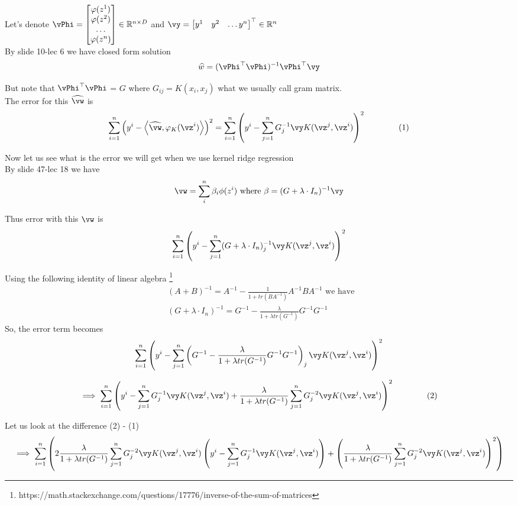 \documentclass[a4paper,11pt]{article}
\begin{document}
\begin{mlsolution}
Let's denote $\vPhi  = \begin{bmatrix}
    \varphi(z^1)\\
    \varphi(z^2)\\
    \ldots\\
     \varphi(z^n) \\
\end{bmatrix} \in \mathbb{R}^{n\times D}$ and $\vy  = \begin{bmatrix} 
    y^1 & y^2 & \ldots y^n \\
\end{bmatrix}^\top \in \mathbb{R}^n$
\\
By slide 10-lec 6 we have closed form solution
$$\widehat{w} = (\vPhi^\top \vPhi )^{-1}\vPhi^\top \vy $$

But note that $\vPhi^\top\vPhi$ = $G$ where $G_{ij} = K(x_i, x_j)$ what we usually call gram matrix.\\
The error for this $\widehat{\vw}$ is 
$$\sum_{i=1}^n\left(y^i - \ip{\widehat{\vw}}{\varphi_K(\vz^i)}\right)^2=\sum_{i=1}^n\left(y^i - \sum_{j=1}^n G_j^{-1}\vy K(\vz^j, \vz^i)\right)^2 \qquad\qquad{(1)} $$

Now let us see what is the error we will get when we use kernel ridge regression\\
By slide 47-lec 18 we have 
$$\vw = \sum_i^n \beta_i \phi(z^i) \text{ where } \beta = (G + \lambda\cdot I_n)^{-1}\vy$$

Thus error with this $\vw$ is 
$$ \sum_{i=1}^n\left(y^i - \sum_{j=1}^n (G + \lambda\cdot I_n)_j^{-1}\vy K(\vz^j, \vz^i)\right)^2 $$

Using the following identity of linear algebra \footnote{https://math.stackexchange.com/questions/17776/inverse-of-the-sum-of-matrices}
\begin{align*}
& (A+B)^{-1} = A^{-1} - \frac{1}{1+tr(BA^{-1})} A^{-1}BA^{-1} \text{ we have }\\
& (G + \lambda\cdot I_n)^{-1} = G^{-1} - \frac{\lambda}{1+\lambda tr(G^{-1})} G^{-1}G^{-1}
\end{align*}
So, the error term becomes 
$$ \sum_{i=1}^n\left(y^i - \sum_{j=1}^n \left(G^{-1} - \frac{\lambda}{1+\lambda tr(G^{-1})} G^{-1}G^{-1}\right)_j \vy K(\vz^j, \vz^i)\right)^2 $$

$$ \implies \sum_{i=1}^n\left(y^i - \sum_{j=1}^n G^{-1}_j \vy K(\vz^j, \vz^i) + \frac{\lambda}{1+\lambda tr(G^{-1})} \sum_{j=1}^n  G^{-2}_j \vy K(\vz^j, \vz^i) \right)^2  \qquad\qquad{(2)}$$

Let us look at the difference (2) - (1)
\begin{dmath*}
 \implies \sum_{i=1}^n \left(  2\frac{\lambda}{1+\lambda tr(G^{-1})} \sum_{j=1}^n  G^{-2}_j \vy K(\vz^j, \vz^i)\left(y^i - \sum_{j=1}^n G^{-1}_j \vy K(\vz^j, \vz^i) \right) +  \left(\frac{\lambda}{1+\lambda tr(G^{-1})} \sum_{j=1}^n  G^{-2}_j \vy K(\vz^j, \vz^i)\right)^2 \right) 
\end{dmath*}


\end{mlsolution}
\end{document}
